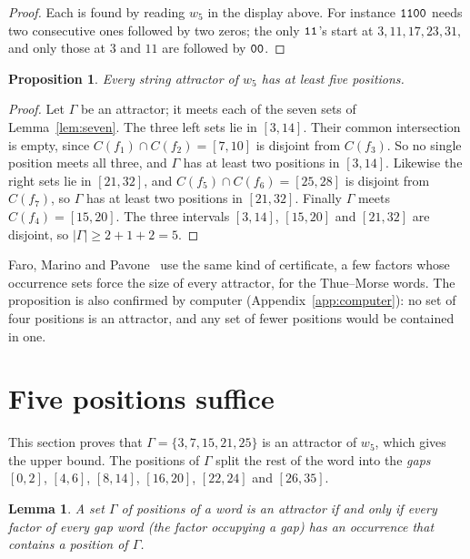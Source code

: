 \documentclass[11pt]{article}
\newtheorem{lemma}[theorem]{Lemma}
\newtheorem{proposition}[theorem]{Proposition}
\theoremstyle{remark}
\newcommand{\w}[1]{\textup{\texttt{#1}}}
\begin{document}
\begin{proof}
Each is found by reading $w_5$ in the display above. For instance $\w{1100}$
needs two consecutive ones followed by two zeros; the only $\w{11}$'s start at
$3,11,17,23,31,$ and only those at $3$ and $11$ are followed by $\w{00}$.
\end{proof}

\begin{proposition}\label{prop:lower}
Every string attractor of $w_5$ has at least five positions.
\end{proposition}

\begin{proof}
Let $\Gamma$ be an attractor; it meets each of the seven sets of
Lemma~\ref{lem:seven}. The three left sets lie in $[3,14]$. Their common
intersection is empty, since $C(f_1)\cap C(f_2)=[7,10]$ is disjoint from
$C(f_3)$. So no single position meets all three, and $\Gamma$ has at least two
positions in $[3,14]$. Likewise the right sets lie in $[21,32]$, and
$C(f_5)\cap C(f_6)=[25,28]$ is disjoint from $C(f_7)$, so $\Gamma$ has at least
two positions in $[21,32]$. Finally $\Gamma$ meets $C(f_4)=[15,20]$. The three
intervals $[3,14]$, $[15,20]$ and $[21,32]$ are disjoint, so
$|\Gamma|\geq2+1+2=5$.
\end{proof}

Faro, Marino and Pavone~\cite{faro} use the same kind of certificate, a few
factors whose occurrence sets force the size of every attractor, for the
Thue--Morse words. The proposition is also confirmed by computer
(Appendix~\ref{app:computer}): no set of four positions is an attractor, and
any set of fewer positions would be contained in one.

\section{Five positions suffice}\label{sec:upper}

This section proves that $\Gamma=\{3,7,15,21,25\}$ is an attractor of $w_5$,
which gives the upper bound. The positions of $\Gamma$ split the rest of the
word into the \emph{gaps} $[0,2]$, $[4,6]$, $[8,14]$, $[16,20]$, $[22,24]$ and
$[26,35]$.

\begin{lemma}\label{lem:gaps}
A set $\Gamma$ of positions of a word is an attractor if and only if every
factor of every gap word (the factor occupying a gap) has an occurrence that
contains a position of $\Gamma$.
\end{lemma}
\end{document}
